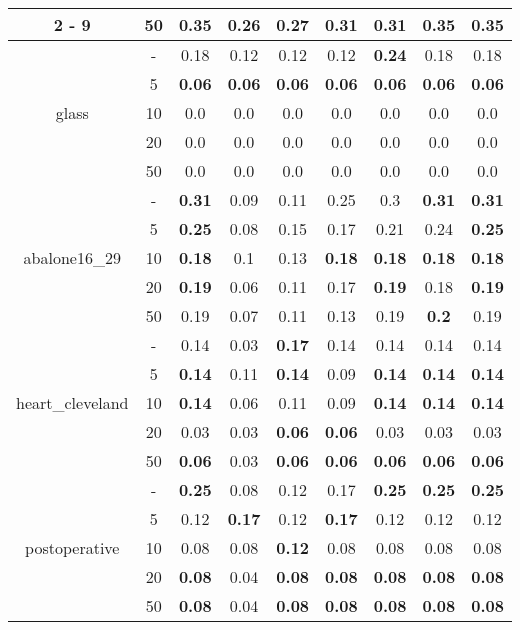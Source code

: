 \documentclass{article}%
\begin{document}
\begin{tabular}{c|c|ccccccc}
\cline{2%
-%
9}%
&50&\textbf{0.35}&0.26&0.27&0.31&0.31&\textbf{0.35}&\textbf{0.35}\\%
\hline%
\multirow{5}{*}{glass}&{-}&0.18&0.12&0.12&0.12&\textbf{0.24}&0.18&0.18\\%
\cline{2%
-%
9}%
&5&\textbf{0.06}&\textbf{0.06}&\textbf{0.06}&\textbf{0.06}&\textbf{0.06}&\textbf{0.06}&\textbf{0.06}\\%
\cline{2%
-%
9}%
&10&0.0&0.0&0.0&0.0&0.0&0.0&0.0\\%
\cline{2%
-%
9}%
&20&0.0&0.0&0.0&0.0&0.0&0.0&0.0\\%
\cline{2%
-%
9}%
&50&0.0&0.0&0.0&0.0&0.0&0.0&0.0\\%
\hline%
\multirow{5}{*}{abalone16\_29}&{-}&\textbf{0.31}&0.09&0.11&0.25&0.3&\textbf{0.31}&\textbf{0.31}\\%
\cline{2%
-%
9}%
&5&\textbf{0.25}&0.08&0.15&0.17&0.21&0.24&\textbf{0.25}\\%
\cline{2%
-%
9}%
&10&\textbf{0.18}&0.1&0.13&\textbf{0.18}&\textbf{0.18}&\textbf{0.18}&\textbf{0.18}\\%
\cline{2%
-%
9}%
&20&\textbf{0.19}&0.06&0.11&0.17&\textbf{0.19}&0.18&\textbf{0.19}\\%
\cline{2%
-%
9}%
&50&0.19&0.07&0.11&0.13&0.19&\textbf{0.2}&0.19\\%
\hline%
\multirow{5}{*}{heart\_cleveland}&{-}&0.14&0.03&\textbf{0.17}&0.14&0.14&0.14&0.14\\%
\cline{2%
-%
9}%
&5&\textbf{0.14}&0.11&\textbf{0.14}&0.09&\textbf{0.14}&\textbf{0.14}&\textbf{0.14}\\%
\cline{2%
-%
9}%
&10&\textbf{0.14}&0.06&0.11&0.09&\textbf{0.14}&\textbf{0.14}&\textbf{0.14}\\%
\cline{2%
-%
9}%
&20&0.03&0.03&\textbf{0.06}&\textbf{0.06}&0.03&0.03&0.03\\%
\cline{2%
-%
9}%
&50&\textbf{0.06}&0.03&\textbf{0.06}&\textbf{0.06}&\textbf{0.06}&\textbf{0.06}&\textbf{0.06}\\%
\hline%
\multirow{5}{*}{postoperative}&{-}&\textbf{0.25}&0.08&0.12&0.17&\textbf{0.25}&\textbf{0.25}&\textbf{0.25}\\%
\cline{2%
-%
9}%
&5&0.12&\textbf{0.17}&0.12&\textbf{0.17}&0.12&0.12&0.12\\%
\cline{2%
-%
9}%
&10&0.08&0.08&\textbf{0.12}&0.08&0.08&0.08&0.08\\%
\cline{2%
-%
9}%
&20&\textbf{0.08}&0.04&\textbf{0.08}&\textbf{0.08}&\textbf{0.08}&\textbf{0.08}&\textbf{0.08}\\%
\cline{2%
-%
9}%
&50&\textbf{0.08}&0.04&\textbf{0.08}&\textbf{0.08}&\textbf{0.08}&\textbf{0.08}&\textbf{0.08}\\%
\hline%
\end{tabular}
\end{document}

